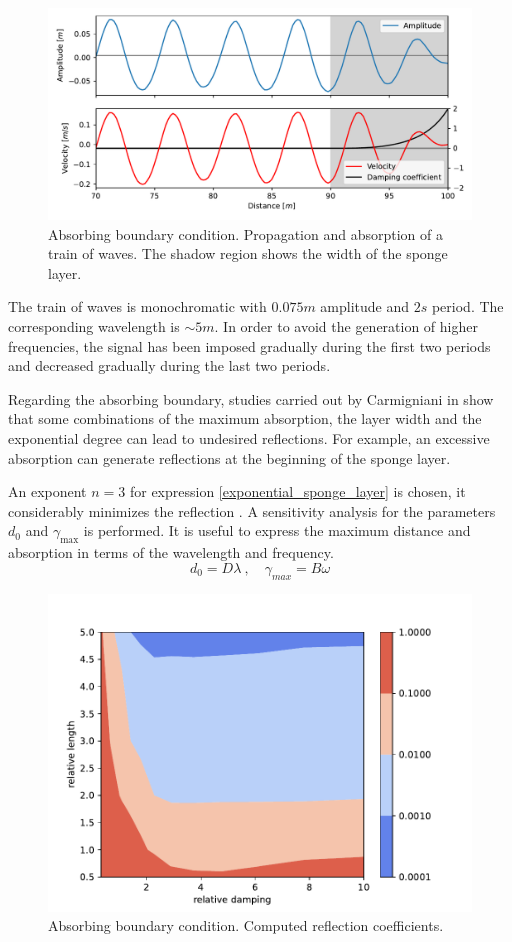 \begin{figure}[ht]
    \centering
    \includegraphics[width=.8\textwidth]{img/boussinesq/absorbing_boundary.pdf}
    \caption{Absorbing boundary condition. Propagation and absorption of a train of waves. The shadow region shows the width of the sponge layer.}
    \label{bsq_abc_boundary}
\end{figure}


The train of waves is monochromatic with $0.075m$ amplitude and $2s$ period. The corresponding wavelength is ${\sim}5m$. In order to avoid the generation of higher frequencies, the signal has been imposed gradually during the first two periods and decreased gradually during the last two periods.

Regarding the absorbing boundary, studies carried out by Carmigniani in \cite{carmigniani2018} show that some combinations of the maximum absorption, the layer width and the exponential degree can lead to undesired reflections. For example, an excessive absorption can generate reflections at the beginning of the sponge layer.


An exponent $n=3$ for expression \ref{exponential_sponge_layer} is chosen, it considerably minimizes the reflection \cite{carmigniani2018}. A sensitivity analysis for the parameters $d_0$ and $\gamma_{\max}$ is performed.
It is useful to express the maximum distance and absorption in terms of the wavelength and frequency.
\begin{equation*}
    d_0 = D \lambda \ , \quad \gamma_{max} = B \omega
\end{equation*}

\begin{figure}[ht]
    \centering
    \includegraphics[width=.8\textwidth]{img/boussinesq/reflection_coefficient.pdf}
    \caption{Absorbing boundary condition. Computed reflection coefficients.}
    \label{bsq_abc_reflection_coefficients}
\end{figure}


